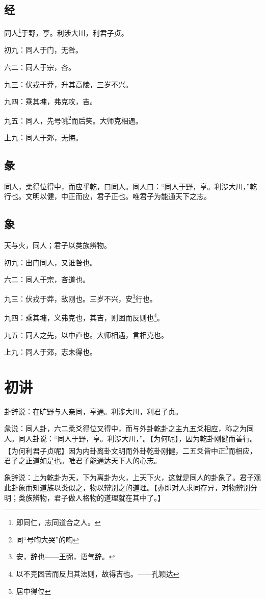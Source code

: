 \documentclass[12pt,oneside]{book}
\begin{document}
\subsection{经}
同人\footnote{即同仁，志同道合之人。}于野，亨。利涉大川，利君子贞。

初九：同人于门，无咎。

六二：同人于宗，吝。

九三：伏戎于莽，升其高陵，三岁不兴。

九四：乘其墉，弗克攻，吉。

九五：同人，先号咷\footnote{同“号啕大哭”的啕}而后笑。大师克相遇。

上九：同人于郊，无悔。

\subsection{彖}
同人，柔得位得中，而应乎乾，曰同人。同人曰：“同人于野，亨。利涉大川，”乾行也。文明以健，中正而应，君子正也。唯君子为能通天下之志。

\subsection{象}
天与火，同人；君子以类族辨物。

初九：出门同人，又谁咎也。

六二：同人于宗，吝道也。

九三：伏戎于莽，敌刚也。三岁不兴，安\footnote{安，辞也——王弼，语气辞。}行也。

九四：乘其墉，义弗克也，其吉，则困而反则也\footnote{以不克困苦而反归其法则，故得吉也。——孔颖达}。

九五：同人之先，以中直也。大师相遇，言相克也。

上九：同人于郊，志未得也。

\section{初讲}
卦辞说：在旷野与人亲同，亨通。利涉大川，利君子贞。

彖说：同人卦，六二柔爻得位又得中，而与外卦乾卦之主九五爻相应，称之为同人。同人卦说：“同人于野，亨。利涉大川，”。【为何呢】，因为乾卦刚健而善行。【为何利君子贞呢】因为内卦离卦文明而外卦乾卦刚健，二五爻皆中正\footnote{居中得位}而相应，君子之正道如是也。唯君子能通达天下人的心志。

象辞说：上为乾卦为天，下为离卦为火，上天下火，这就是同人的卦象了。君子观此卦象而知道族以类似之，物以辩别之的道理。【亦即对人求同存异，对物辨别分明；类族辨物，君子做人格物的道理就在其中了。】
\end{document}
